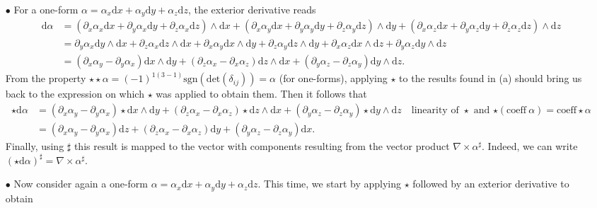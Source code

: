 \documentclass[10pt, a4paper]{article}
\begin{document}
{\begin{enumerate}
\begin{enumerate}
    \item[$\bullet$] For a one-form $\alpha = \alpha_x \text{d}x + \alpha_y \text{d}y + \alpha_z \text{d}z$, the exterior derivative reads 
    \begin{align*}
      \text{d}\alpha &= (\partial_x \alpha_x \text{d}x + \partial_y \alpha_x \text{d}y + \partial_z \alpha_x \text{d}z)\wedge \text{d}x +  (\partial_x \alpha_y \text{d}x + \partial_y \alpha_y \text{d}y + \partial_z \alpha_y \text{d}z)\wedge \text{d}y  +  (\partial_x \alpha_z \text{d}x + \partial_y \alpha_z \text{d}y + \partial_z \alpha_z \text{d}z)\wedge \text{d}z \\
      &= \partial_y \alpha_x \text{d}y \wedge \text{d}x + \partial_z \alpha_x \text{d}z \wedge \text{d}x + \partial_x \alpha_y \text{d}x \wedge \text{d}y + \partial_z \alpha_y \text{d}z \wedge \text{d}y + \partial_x \alpha_z \text{d}x \wedge \text{d}z + \partial_y \alpha_z \text{d}y \wedge \text{d}z\\
      &= (\partial_x \alpha_y -\partial_y \alpha_x) \text{d}x \wedge \text{d}y + (\partial_z \alpha_x - \partial_x \alpha_z) \text{d}z \wedge \text{d}x + (\partial_y \alpha_z -  \partial_z \alpha_y) \text{d}y \wedge \text{d}z.
    \end{align*}
    From the property $\star \star \alpha = (-1)^{1(3-1)} \text{sgn}(\text{det}(\delta_{ij})) = \alpha$ (for one-forms), applying $\star$ to the results found in (a) should bring us back to the expression on which $\star$ was applied to obtain them. Then it follows that 
    \begin{align*}
      \star \text{d}\alpha &= (\partial_x \alpha_y -\partial_y \alpha_x) \star\text{d}x \wedge \text{d}y + (\partial_z \alpha_x - \partial_x \alpha_z) \star\text{d}z \wedge \text{d}x + (\partial_y \alpha_z -  \partial_z \alpha_y) \star\text{d}y \wedge \text{d}z \quad \text{linearity of $\star$ and $\star(\text{coeff}\ \alpha) = \text{coeff}\star \alpha$}\\
      &= (\partial_x \alpha_y -\partial_y \alpha_x) \text{d}z + (\partial_z \alpha_x - \partial_x \alpha_z) \text{d}y + (\partial_y \alpha_z -  \partial_z \alpha_y) \text{d}x.
    \end{align*} 
    Finally, using $\sharp$ this result is mapped to the vector with components resulting from the vector product $\nabla \times \alpha^{\sharp}$. Indeed, we can write $(\star \text{d}\alpha)^{\sharp}  = \nabla \times \alpha^{\sharp}$.
    \item[$\bullet$] Now consider again a one-form $\alpha = \alpha_x \text{d}x + \alpha_y \text{d}y + \alpha_z \text{d}z$. This time, we start by applying $\star$ followed by an exterior derivative to obtain 

\end{enumerate}
\end{enumerate}}
\end{document}
